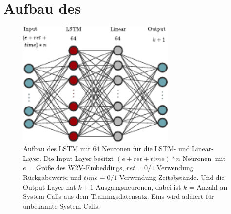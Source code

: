    \section{Aufbau des }\label{sec:aufbau_lstm}
        \begin{figure}[ht]
            \centering
            \includegraphics[width=0.7\textwidth]{images/lstm.pdf}
            \caption[Aufbau des \ac{LSTM}]{Aufbau des \ac{LSTM} mit $64$ Neuronen für die \ac{LSTM}- und Linear-Layer.
                Die Input Layer besitzt $(e + ret + time) * n$ Neuronen, mit $e$ = Größe des \ac{W2V}-Embeddings,
                $ret=0\text{/}1$ Verwendung Rückgabewerte und $time=0\text{/}1$ Verwendung Zeitabstände.
                Und die Output Layer hat $k+1$ Ausgangsneuronen, dabei ist $k$ = Anzahl an System Calls aus dem Trainingsdatensatz.
                Eins wird addiert für unbekannte System Calls.}
                \label{fig:lstm}
        \end{figure}

